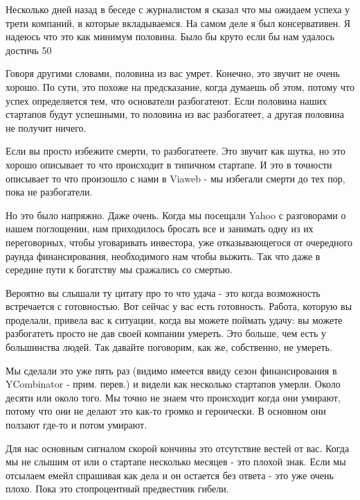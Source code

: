 \documentclass[ebook,12pt,oneside,openany]{memoir}
\begin{document}
\maketitle

Несколько дней назад в беседе с журналистом я сказал что мы ожидаем
успеха у трети компаний, в которые вкладываемся. На самом деле я был
консервативен. Я надеюсь что это как минимум половина. Было бы круто
если бы нам удалось достичь 50%

Говоря другими словами, половина из вас умрет. Конечно, это звучит не
очень хорошо. По сути, это похоже на предсказание, когда думаешь об
этом, потому что успех определяется тем, что основатели разбогатеют.
Если половина наших стартапов будут успешными, то половина из вас
разбогатеет, а другая половина не получит ничего.



Если вы просто избежите смерти, то разбогатеете. Это звучит как шутка,
но это хорошо описывает то что происходит в типичном стартапе. И это в
точности описывает то что произошло с нами в Viaweb - мы избегали
смерти до тех пор, пока не разбогатели.

Но это было напряжно. Даже очень. Когда мы посещали Yahoo с
разговорами о нашем поглощении, нам приходилось бросать все и занимать
одну из их переговорных, чтобы уговаривать инвестора, уже
отказывающегося от очередного раунда финансирования, необходимого нам
чтобы выжить. Так что даже в середине пути к богатству мы сражались со
смертью.

Вероятно вы слышали ту цитату про то что удача - это когда возможность
встречается с готовностью. Вот сейчас у вас есть готовность. Работа,
которую вы проделали, привела вас к ситуации, когда вы можете поймать
удачу: вы можете разбогатеть просто не дав своей компании умереть. Это
больше, чем есть у большинства людей. Так давайте поговорим, как же,
собственно, не умереть.

Мы сделали это уже пять раз (видимо имеется ввиду сезон финансирования
в YCombinator - прим. перев.) и видели как несколько стартапов умерли.
Около десяти или около того. Мы точно не знаем что происходит когда
они умирают, потому что они не делают это как-то громко и героически.
В основном они ползают где-то и потом умирают.

Для нас основным сигналом скорой кончины это отсутствие вестей от вас.
Когда мы не слышим от или о стартапе несколько месяцев - это плохой
знак. Если мы отсылаем емейл спрашивая как дела и он остается без
ответа - это уже очень плохо. Пока это стопроцентный предвестник
гибели.
\end{document}
